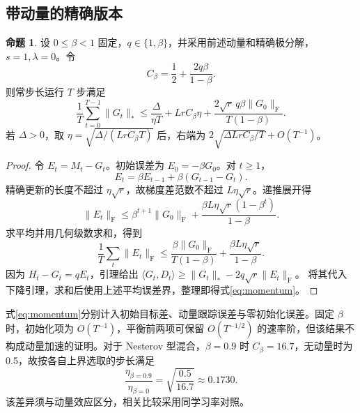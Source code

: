 \documentclass[11pt,a4paper]{article}
\theoremstyle{definition}
\newtheorem{theorem}{命题}
\newcommand{\F}{\mathrm{F}}
\begin{document}
\subsection{带动量的精确版本}
\begin{theorem}
设 $0\le\beta<1$ 固定，$q\in\{1,\beta\}$，并采用前述动量和精确极分解，$s=1,\lambda=0$。令
\[
 C_\beta=\frac12+\frac{2q\beta}{1-\beta}.
\]
则常步长运行 $T$ 步满足
\begin{equation}
 \frac1T\sum_{t=0}^{T-1}\|G_t\|_*
 \le \frac{\Delta}{\eta T}+Lr C_\beta\eta
 +\frac{2\sqrt r\,q\beta\|G_0\|_\F}{T(1-\beta)}.
 \label{eq:momentum}
\end{equation}
若 $\Delta>0$，取 $\eta=\sqrt{\Delta/(LrC_\beta T)}$ 后，右端为
$2\sqrt{\Delta LrC_\beta/T}+O(T^{-1})$。
\end{theorem}
\begin{proof}
令 $E_t=M_t-G_t$。初始误差为 $E_0=-\beta G_0$。对 $t\ge1$，
\[
E_t=\beta E_{t-1}+\beta(G_{t-1}-G_t).
\]
精确更新的长度不超过 $\eta\sqrt r$，故梯度差范数不超过 $L\eta\sqrt r$。递推展开得
\[
 \|E_t\|_\F\le\beta^{t+1}\|G_0\|_\F
 +\frac{\beta L\eta\sqrt r(1-\beta^t)}{1-\beta}.
\]
求平均并用几何级数求和，得到
\begin{equation}
 \frac1T\sum_t\|E_t\|_\F
 \le\frac{\beta\|G_0\|_\F}{T(1-\beta)}
 +\frac{\beta L\eta\sqrt r}{1-\beta}.
\end{equation}
因为 $H_t-G_t=qE_t$，引理给出
$\langle G_t,D_t\rangle\ge\|G_t\|_*-2q\sqrt r\|E_t\|_\F$。
将其代入下降引理，求和后使用上述平均误差界，整理即得式\eqref{eq:momentum}。
\end{proof}
式\eqref{eq:momentum}分别计入初始目标差、动量跟踪误差与零初始化误差。固定 $\beta$ 时，初始化项为 $O(T^{-1})$，平衡前两项可保留 $O(T^{-1/2})$ 的速率阶，但该结果不构成动量加速的证明。对于 Nesterov 型混合，$\beta=0.9$ 时 $C_\beta=16.7$，无动量时为 0.5，故按各自上界选取的步长满足
\begin{equation}
 \frac{\eta_{\beta=0.9}}{\eta_{\beta=0}}=
 \sqrt{\frac{0.5}{16.7}}\approx0.1730.
 \label{eq:eta-ratio}
\end{equation}
该差异须与动量效应区分，相关比较采用同学习率对照。
\end{document}
